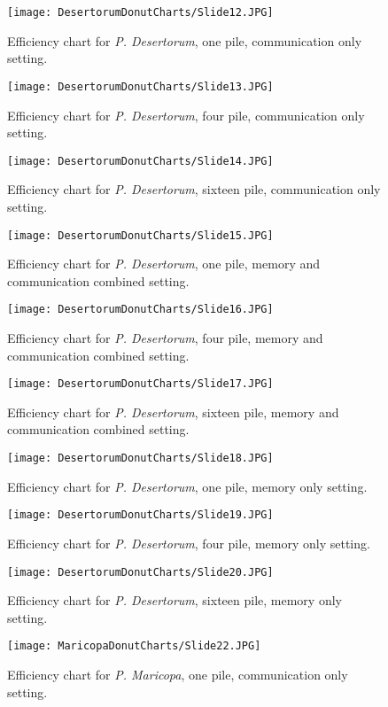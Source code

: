 \begin{figure}[h]
	\texttt{[image: DesertorumDonutCharts/Slide12.JPG]}
	\caption{Efficiency chart for \textit{P. Desertorum}, one pile,  communication only setting.}
\end{figure}
\begin{figure}[h]
	\texttt{[image: DesertorumDonutCharts/Slide13.JPG]}
	\caption{Efficiency chart for \textit{P. Desertorum}, four pile,  communication only setting.}
\end{figure}
\begin{figure}[h]
	\texttt{[image: DesertorumDonutCharts/Slide14.JPG]}
	\caption{Efficiency chart for \textit{P. Desertorum}, sixteen pile,  communication only setting.}
\end{figure}
\begin{figure}[h]
	\texttt{[image: DesertorumDonutCharts/Slide15.JPG]}
	\caption{Efficiency chart for \textit{P. Desertorum}, one pile,  memory and communication combined setting.}
\end{figure}
\begin{figure}[h]
	\texttt{[image: DesertorumDonutCharts/Slide16.JPG]}
	\caption{Efficiency chart for \textit{P. Desertorum}, four pile, memory and communication combined setting.}
\end{figure}
\begin{figure}[h]
	\texttt{[image: DesertorumDonutCharts/Slide17.JPG]}
	\caption{Efficiency chart for \textit{P. Desertorum}, sixteen pile,  memory and communication combined setting.}
\end{figure}
\begin{figure}[h]
	\texttt{[image: DesertorumDonutCharts/Slide18.JPG]}
	\caption{Efficiency chart for \textit{P. Desertorum}, one pile,  memory only setting.}
\end{figure}
\begin{figure}[h]
	\texttt{[image: DesertorumDonutCharts/Slide19.JPG]}
	\caption{Efficiency chart for \textit{P. Desertorum}, four pile,  memory only setting.}
\end{figure}
\begin{figure}[h]
	\texttt{[image: DesertorumDonutCharts/Slide20.JPG]}
	\caption{Efficiency chart for \textit{P. Desertorum}, sixteen pile,  memory only setting.}
\end{figure}
\clearpage
\begin{figure}[h]
	\texttt{[image: MaricopaDonutCharts/Slide22.JPG]}
	\caption{Efficiency chart for \textit{P. Maricopa}, one pile,  communication only setting.}
\end{figure}
